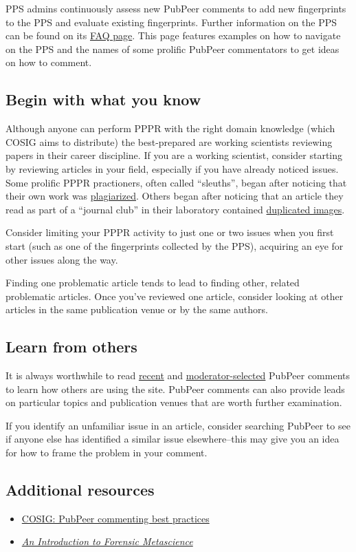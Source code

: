 \documentclass[letterpaper, 12pt]{article}
\begin{document}
PPS admins continuously assess new PubPeer comments to add new fingerprints to the PPS and evaluate existing fingerprints. Further information on the PPS can be found on its \href{https://www.irit.fr/~Guillaume.Cabanac/problematic-paper-screener/faq}{FAQ page}. This page features examples on how to navigate on the PPS and the names of some prolific PubPeer commentators to get ideas on how to comment.

\subsection*{Begin with what you know}

Although anyone can perform PPPR with the right domain knowledge (which COSIG aims to distribute) the best-prepared are working scientists reviewing papers in their career discipline. If you are a working scientist, consider starting by reviewing articles in your field, especially if you have already noticed issues. Some prolific PPPR practioners, often called ``sleuths'', began after noticing that their own work was \href{https://osf.io/ntcb4}{plagiarized}. Others began after noticing that an article they read as part of a ``journal club'' in their laboratory contained \href{https://osf.io/547re}{duplicated images}.

Consider limiting your PPPR activity to just one or two issues when you first start (such as one of the fingerprints collected by the PPS), acquiring an eye for other issues along the way.

Finding one problematic article tends to lead to finding other, related problematic articles. Once you've reviewed one article, consider looking at other articles in the same publication venue or by the same authors.

\subsection*{Learn from others}

It is always worthwhile to read \href{https://pubpeer.com/recent/}{recent} and \href{https://pubpeer.com/}{moderator-selected} PubPeer comments to learn how others are using the site. PubPeer comments can also provide leads on particular topics and publication venues that are worth further examination.

If you identify an unfamiliar issue in an article, consider searching PubPeer to see if anyone else has identified a similar issue elsewhere--this may give you an idea for how to frame the problem in your comment.

\subsection*{Additional resources}

\begin{itemize}
    \setlength\itemsep{-0.5em}
    \item \href{https://osf.io/sghaq}{COSIG: PubPeer commenting best practices}
    \item \href{https://doi.org/10.5281/zenodo.14871842}{\textit{An Introduction to Forensic Metascience}}
\end{itemize}
\end{document}
